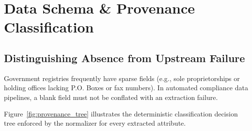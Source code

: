 \documentclass[11pt,a4paper]{article}
\begin{document}
\section{\color{techprimary}Data Schema \& Provenance Classification}

\subsection{Distinguishing Absence from Upstream Failure}
Government registries frequently have sparse fields (e.g., sole proprietorships or holding offices lacking P.O. Boxes or fax numbers). In automated compliance data pipelines, a blank field must not be conflated with an extraction failure.

Figure~\ref{fig:provenance_tree} illustrates the deterministic classification decision tree enforced by the normalizer for every extracted attribute.
\end{document}
